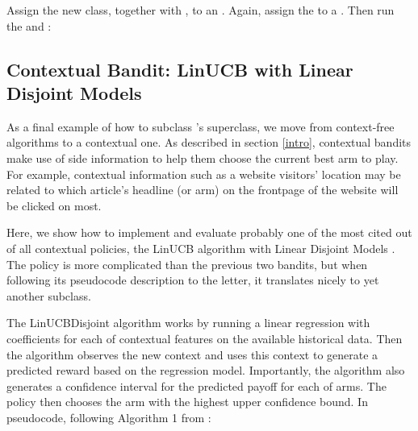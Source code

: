 \documentclass{jss}
\begin{document}
Assign the new class, together with , to an . Again, assign the  to a . Then run the  and :


\subsection{Contextual Bandit: LinUCB with Linear Disjoint Models} \label{linucbc}

As a final example of how to subclass 's  superclass, we move from context-free algorithms to a contextual one. As described in section \ref{intro}, contextual bandits make use of side information to help them choose the current best arm to play. For example, contextual information such as a website visitors' location may be related to which article's headline (or arm) on the frontpage of the website will be clicked on most.

Here, we show how to implement and evaluate probably one of the most cited out of all contextual policies, the LinUCB algorithm with Linear Disjoint Models \cite{Li2010}. The policy is more complicated than the previous two bandits, but when following its pseudocode description to the letter, it translates nicely to yet another  subclass.

The LinUCBDisjoint algorithm works by running a linear regression with coefficients for each of  contextual features on the available historical data. Then the algorithm observes the new context and uses this context to generate a predicted reward based on the regression model. Importantly, the algorithm also generates a confidence interval for the predicted payoff for each of  arms. The policy then chooses the arm with the highest upper confidence bound. In pseudocode, following Algorithm 1 from \cite{Li2010}:
\end{document}
